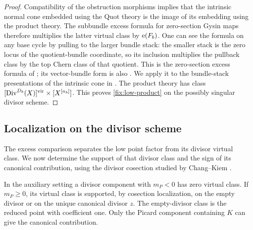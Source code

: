 \begin{proof}
Compatibility of the obstruction morphisms implies that the
intrinsic normal cone embedded using the Quot theory is the
image of its embedding using the product theory.
The subbundle excess formula for zero-section Gysin maps
therefore multiplies the latter virtual class by \(\operatorname{e}(F_b)\).
One can see the formula on any base cycle by pulling to the
larger bundle stack: the smaller stack is the zero locus of
the quotient-bundle coordinate, so its inclusion multiplies
the pullback class by the top Chern class of that quotient.
This is the zero-section excess formula of
\cite[\S6.3]{Fulton}; its vector-bundle form is also
\cite[Lemma~2.5]{KiemLi}.  We apply it to the bundle-stack presentations
of the intrinsic cone in \cite{BF}.
The product theory has class
\([\operatorname{Div}^{D_b}(X)]^{\mathrm{vir}}\times[X^{[n_b]}]\).
This proves \eqref{fix:low-product} on the possibly singular
divisor scheme.
\end{proof}

\subsection{Localization on the divisor scheme}

The excess comparison separates the low point factor from its divisor
virtual class. We now determine the support of that divisor class
and the sign of its canonical contribution, using the divisor cosection
studied by Chang--Kiem \cite[Section~3.2]{ChangKiem}.

\begin{lemma}\label{fix:cosection-support}
In the auxiliary setting a divisor component with \(m_P<0\)
has zero virtual class.  If \(m_P\ge0\), its virtual class
is supported, by cosection localization, on the empty
divisor or on the unique canonical divisor \(z\).
The empty-divisor class is the reduced point with coefficient
one.  Only the Picard component containing \(K\) can give
the canonical contribution.
\end{lemma}

